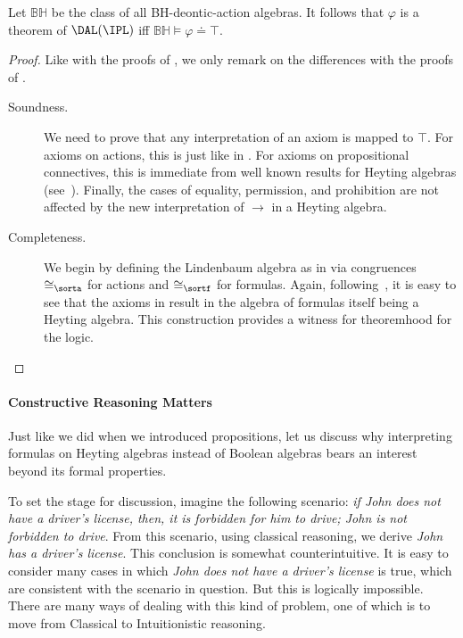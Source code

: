\medskip
\begin{theorem}\label{prop:completeness:heyting:formulas}
	 Let $\mathbb{BH}$ be the class of all BH-deontic-action algebras.
	 It follows that $\varphi$ is a theorem of $\DAL(\IPL)$ iff $\mathbb{BH} \vDash {\varphi \doteq \top}$.
\end{theorem}
\begin{proof}
	Like with the proofs of , we only remark on the differences with the proofs of .
	\begin{description}
		\item[Soundness.]
		We need to prove that any interpretation of an axiom is mapped to $\top$.
		For axioms on actions, this is just like in .
		For axioms on propositional connectives, this is  immediate from well known results for
		Heyting algebras (see~\cite{vanDalen:2008,Troelstra:1988}).
		Finally, the cases of equality, permission, and prohibition are not affected by the new interpretation of $\to$ in a Heyting algebra.

		\item[Completeness.]
		We begin by defining the Lindenbaum algebra as in  via congruences $\cong_{\sorta}$ for actions and $\cong_{\sortf}$ for formulas.
		Again, following~\cite{vanDalen:2008}, it is easy to see that the axioms in  result in the algebra of formulas itself being a Heyting algebra.
		This construction provides a witness for theoremhood for the logic.
		\qedhere
	\end{description}
\end{proof}

\paragraph{Constructive Reasoning Matters}

Just like we did when we introduced propositions, let us discuss why interpreting formulas on Heyting algebras instead of Boolean algebras bears an interest beyond its formal properties.

To set the stage for discussion, imagine the following scenario: \emph{if John does not have a driver's license, then, it is forbidden for him to drive; John is not forbidden to drive}.
From this scenario, using classical reasoning, we derive \emph{John has a driver's license}.
This conclusion is somewhat counterintuitive.
It is easy to consider many cases in which \emph{John does not have a driver's license} is true, which are consistent with the scenario in question.
But this is logically impossible.
There are many ways of dealing with this kind of problem, one of which is to move from Classical to Intuitionistic reasoning. %

